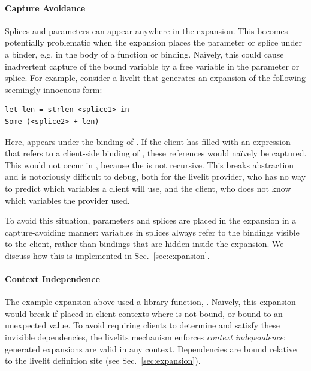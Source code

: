 \paragraph{Capture Avoidance}
Splices and parameters can appear anywhere in the expansion. 
This becomes potentially problematic when
the expansion places the parameter or splice under a binder, e.g. in the body of a function or  binding.
Na\"ively, this could cause inadvertent capture of the bound variable by a free variable
in the parameter or splice. For example, consider a livelit that generates an expansion
of the following seemingly innocuous form:
\begin{lstlisting}[numbers=none]
let len = strlen <splice1> in
Some (<splice2> + len)
\end{lstlisting}
Here,  appears under the binding of . If the client has filled
 with an expression that refers to a client-side binding of ,
these references would na\"ively be captured. This would not occur in , 
because the  is not recursive.
This breaks abstraction and is notoriously difficult to debug,
both for the livelit provider, who has no way to predict which variables a client will use,
 and the client, who does not know which variables the provider used.

To avoid this situation, parameters and splices are placed in the expansion
in a capture-avoiding manner: variables in splices
always refer to the bindings visible to the client, 
rather than bindings that are hidden inside the expansion.
We discuss how this is implemented in Sec.~\ref{sec:expansion}.

\paragraph{Context Independence}
The example expansion above used a library function, .
Na\"ively, this expansion would break if placed 
in client contexts where  is not bound, or bound to 
an unexpected value.
To avoid requiring clients to determine and satisfy these invisible 
dependencies, the livelits mechanism enforces \emph{context independence}:
generated expansions are valid in any context. Dependencies are bound 
relative to the livelit definition site (see Sec.~\ref{sec:expansion}).

